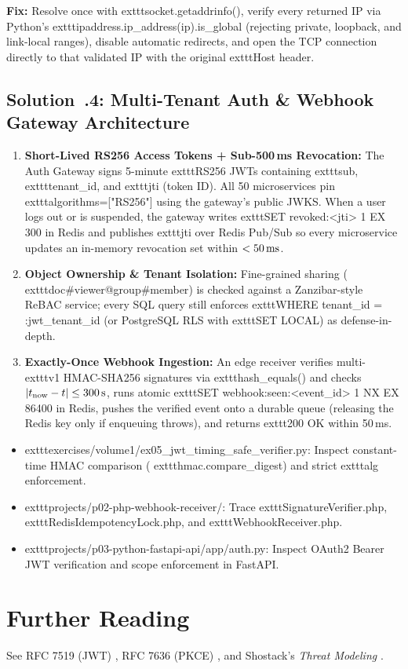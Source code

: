 \textbf{Fix:} Resolve once with 	exttt{socket.getaddrinfo()}, verify every returned IP via Python's 	exttt{ipaddress.ip\_address(ip).is\_global} (rejecting private, loopback, and link-local ranges), disable automatic redirects, and open the TCP connection directly to that validated IP with the original 	exttt{Host} header.

\subsection{Solution~\thechapter.4: Multi-Tenant Auth \protect\& Webhook Gateway Architecture}
\begin{enumerate}[leftmargin=15pt]
  \item \textbf{Short-Lived RS256 Access Tokens + Sub-500\,ms Revocation:} The Auth Gateway signs 5-minute 	exttt{RS256} JWTs containing 	exttt{sub}, 	exttt{tenant\_id}, and 	exttt{jti} (token ID). All 50 microservices pin 	exttt{algorithms=["RS256"]} using the gateway's public JWKS. When a user logs out or is suspended, the gateway writes 	exttt{SET revoked:<jti> 1 EX 300} in Redis and publishes 	exttt{jti} over Redis Pub/Sub so every microservice updates an in-memory revocation set within $<50\text{\,ms}$.
  \item \textbf{Object Ownership \& Tenant Isolation:} Fine-grained sharing (	exttt{doc\#viewer@group\#member}) is checked against a Zanzibar-style ReBAC service; every SQL query still enforces 	exttt{WHERE tenant\_id = :jwt\_tenant\_id} (or PostgreSQL RLS with 	exttt{SET LOCAL}) as defense-in-depth.
  \item \textbf{Exactly-Once Webhook Ingestion:} An edge receiver verifies multi-	exttt{v1} HMAC-SHA256 signatures via 	exttt{hash\_equals()} and checks $|t_{\text{now}} - t| \le 300\text{\,s}$, runs atomic 	exttt{SET webhook:seen:<event\_id> 1 NX EX 86400} in Redis, pushes the verified event onto a durable queue (releasing the Redis key only if enqueuing throws), and returns 	exttt{200 OK} within 50\,ms.
\end{enumerate}

\begin{labbridgebox}
\begin{itemize}[leftmargin=15pt,itemsep=2pt]
  \item 	exttt{exercises/volume1/ex05\_jwt\_timing\_safe\_verifier.py}: Inspect constant-time HMAC comparison (	exttt{hmac.compare\_digest}) and strict 	exttt{alg} enforcement.
  \item 	exttt{projects/p02-php-webhook-receiver/}: Trace 	exttt{SignatureVerifier.php}, 	exttt{RedisIdempotencyLock.php}, and 	exttt{WebhookReceiver.php}.
  \item 	exttt{projects/p03-python-fastapi-api/app/auth.py}: Inspect OAuth2 Bearer JWT verification and scope enforcement in FastAPI.
\end{itemize}
\end{labbridgebox}

\section*{Further Reading}
See RFC 7519 (JWT) \cite{rfc7519}, RFC 7636 (PKCE) \cite{rfc7636}, and Shostack's \textit{Threat Modeling} \cite{shostack2014threat}.
